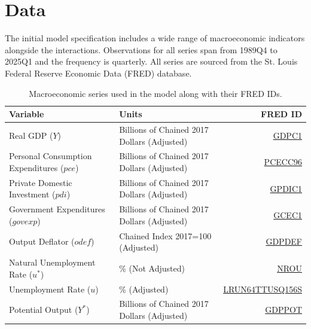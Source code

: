 \section{Data}\label{sec:data}
The initial model specification includes a wide range of macroeconomic indicators alongside the interactions.
Observations for all series span from 1989Q4 to 2025Q1 and the frequency is quarterly.
All series are sourced from the St. Louis Federal Reserve Economic Data (FRED) database.

\begin{table}[H]
    \centering
    \small
    \begin{tabular}{llr}
        \toprule
        Variable & Units & FRED ID \\
        \midrule
        Real GDP ($Y$) & Billions of Chained 2017 Dollars (Adjusted) & \href{https://fred.stlouisfed.org/series/GDPC1}{GDPC1} \\
        Personal Consumption Expenditures ($pce$) & Billions of Chained 2017 Dollars (Adjusted) & \href{https://fred.stlouisfed.org/series/PCECC96}{PCECC96} \\
        Private Domestic Investment ($pdi$) & Billions of Chained 2017 Dollars (Adjusted) & \href{https://fred.stlouisfed.org/series/GPDIC1}{GPDIC1} \\
        Government Expenditures ($govexp$) & Billions of Chained 2017 Dollars (Adjusted) & \href{https://fred.stlouisfed.org/series/GCEC1}{GCEC1} \\
        Output Deflator ($odef$) & Chained Index 2017=100 (Adjusted) & \href{https://fred.stlouisfed.org/series/GDPDEF}{GDPDEF} \\
        Natural Unemployment Rate ($u^*$) & \% (Not Adjusted) & \href{https://fred.stlouisfed.org/series/NROU}{NROU} \\
        Unemployment Rate ($u$) & \% (Adjusted) & \href{https://fred.stlouisfed.org/series/LRUN64TTUSQ156S}{LRUN64TTUSQ156S} \\
        Potential Output ($Y^*$) & Billions of Chained 2017 Dollars (Adjusted) & \href{https://fred.stlouisfed.org/series/GDPPOT}{GDPPOT} \\
        \bottomrule
    \end{tabular}
    \caption{Macroeconomic series used in the model along with their FRED IDs.}
    \label{tab:fred_series}
\end{table}

